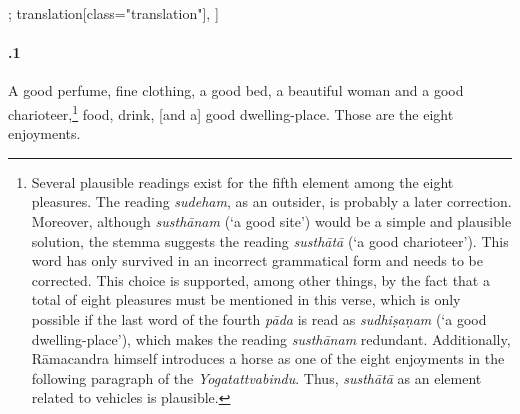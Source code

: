 \begin{alignment}[
  texts=edition[class="edition"];
  translation[class="translation"],
  ]
\begin{translation}
\begin{tlate}[22_1]
      \paragraph{.1} A good perfume, fine clothing, a good bed, a beautiful woman and a good charioteer,\footnote{Several plausible readings exist for the fifth element among the eight pleasures. The reading \textit{sudeham}, as an outsider, is probably a later correction. Moreover, although \textit{susthānam} (`a good site') would be a simple and plausible solution, the stemma suggests the reading \textit{susthātā} (`a good charioteer'). This word has only survived in an incorrect grammatical form and needs to be corrected. This choice is supported, among other things, by the fact that a total of eight pleasures must be mentioned in this verse, which is only possible if the last word of the fourth \textit{pāda} is read as \textit{sudhiṣaṇam} (`a good dwelling-place'), which makes the reading \textit{susthānam} redundant. Additionally, Rāmacandra himself introduces a horse as one of the eight enjoyments in the following paragraph of the \textit{Yogatattvabindu}. Thus, \textit{susthātā} as an element related to vehicles is plausible.} food, drink, [and a] good dwelling-place. Those are the eight enjoyments.
      \flushpage
        \end{tlate}
  \end{translation}
\end{alignment}
\pagebreak %
